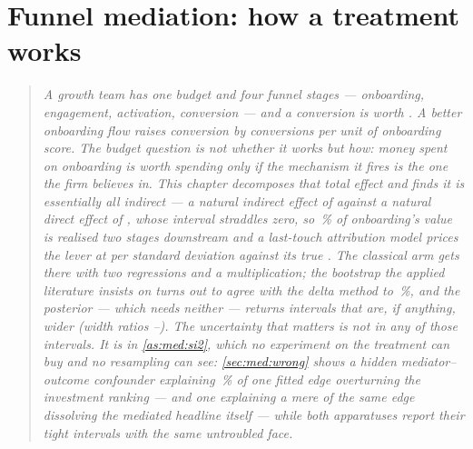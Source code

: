%
\chapter{Funnel mediation: how a treatment works}
\label{ch:med}

\begin{quote}\small
\emph{A growth team has one budget and four funnel stages --- onboarding, engagement,
activation, conversion --- and a conversion is worth \eur{\nbFourValuePerConv}. A better
onboarding flow raises conversion by \nbFourBayesTotal{} conversions per unit of onboarding
score. The budget question is not whether it works but \emph{how}: money spent on onboarding is
worth spending only if the mechanism it fires is the one the firm believes in. This chapter
decomposes that total effect and finds it is essentially all \emph{indirect} --- a natural
indirect effect of \nbFourBayesNie{} against a natural direct effect of \nbFourBayesDirect{}, whose
interval straddles zero, so \nbFourPropMediated\,\% of onboarding's value is realised two stages
downstream and a last-touch attribution model prices the lever at \eur{\nbFourValOnboardingNaive}
per standard deviation against its true \eur{\nbFourValOnboarding}. The
classical arm gets there with two regressions and a multiplication; the bootstrap the applied
literature insists on turns out to agree with the delta method to \nbFourSeGapPct\,\%, and the
posterior --- which needs neither --- returns intervals that are, if anything, \emph{wider}
(width ratios \nbFourWidthMin--\nbFourWidthMax). The uncertainty that matters is not in any of
those intervals. It is in \cref{as:med:si2}, which no experiment on the treatment can buy and no
resampling can see: \cref{sec:med:wrong} shows a hidden mediator--outcome confounder explaining
\nbFourFlipMed\,\% of one fitted edge overturning the investment ranking --- and one explaining a
mere \pc{\nbFourNdeClearsZeroPct} of the same edge dissolving the mediated headline itself --- while
both apparatuses report their tight intervals with the same untroubled face.}
\end{quote}

